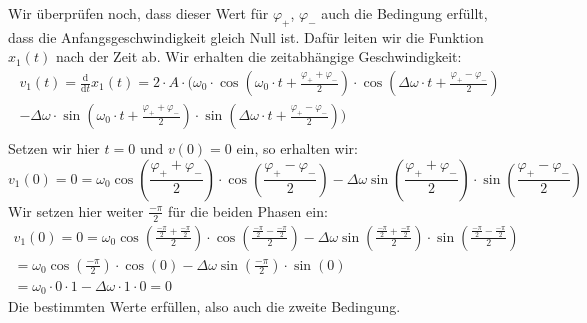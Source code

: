 \documentclass{article}
\begin{document}
                  Wir überprüfen noch, dass dieser Wert für \(\varphi_{+}\), \( \varphi_{-} \) auch die Bedingung erfüllt, dass die Anfangsgeschwindigkeit gleich Null ist.
                  Dafür leiten wir die Funktion \(x_1(t)\) nach der Zeit ab. Wir erhalten die zeitabhängige Geschwindigkeit:
                  \begin{equation}
                      \begin{gathered}
                          v_1(t) = \frac{\mathrm{d}}{\mathrm{d} t} x_1(t) = 2 \cdot A \cdot \bigg(
                          \omega_0 \cdot \cos \left( \omega_0 \cdot t + \frac{\varphi_{+} + \varphi_{-} }{2} \right) \cdot \cos\left( \Delta \omega \cdot t + \frac{\varphi_{+} - \varphi_{-} }{2} \right) \\
                          - \Delta \omega \cdot \sin\left( \omega_0 \cdot t + \frac{\varphi_{+} + \varphi_{-} }{2} \right) \cdot \sin\left( \Delta \omega \cdot t + \frac{\varphi_{+} - \varphi_{-} }{2} \right) \bigg) \\
                      \end{gathered}
                  \end{equation}
                  Setzen wir hier \(t = 0\) und \(v(0) = 0\) ein, so erhalten wir:
                  \begin{equation}
                      v_1(0) = 0 = \omega_0 \cos \left( \frac{\varphi_{+} + \varphi_{-} }{2} \right) \cdot \cos \left( \frac{\varphi_{+} - \varphi_{-} }{2} \right) - \Delta \omega \sin \left( \frac{\varphi_{+} + \varphi_{-} }{2} \right) \cdot \sin \left( \frac{\varphi_{+} - \varphi_{-} }{2} \right)
                  \end{equation}
                  Wir setzen hier weiter \( \frac{-\pi}{2} \) für die beiden Phasen ein:
                  \begin{equation}
                      \begin{gathered}
                          v_1(0) = 0 = \omega_0 \cos \left( \frac{ \frac{-\pi}{2} + \frac{-\pi}{2} }{2} \right) \cdot \cos \left( \frac{ \frac{-\pi}{2} - \frac{-\pi}{2} }{2} \right) - \Delta \omega \sin \left( \frac{ \frac{-\pi}{2} + \frac{-\pi}{2} }{2} \right) \cdot \sin \left( \frac{ \frac{-\pi}{2} - \frac{-\pi}{2} }{2} \right) \\
                          = \omega_0 \cos \left( \frac{-\pi}{2} \right) \cdot \cos \left( 0 \right) - \Delta \omega \sin \left( \frac{-\pi}{2} \right) \cdot \sin \left( 0 \right) \\
                          = \omega_0 \cdot 0 \cdot 1 - \Delta \omega \cdot 1 \cdot 0 = 0
                      \end{gathered}
                  \end{equation}
                  Die bestimmten Werte erfüllen, also auch die zweite Bedingung.
\end{document}
